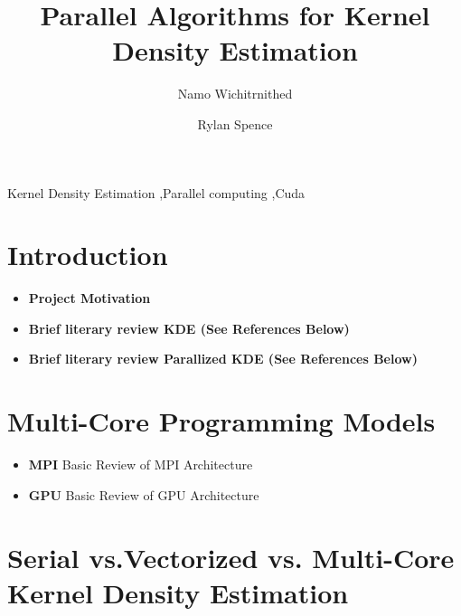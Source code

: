 \documentclass[review]{elsarticle}
\begin{document}
\begin{frontmatter}

\title{Parallel Algorithms for Kernel Density Estimation}


\author[oden]{Namo Wichitrnithed}

\author[oden]{Rylan Spence}



\begin{abstract}

\end{abstract}

\begin{keyword}
Kernel Density Estimation \sep Parallel computing \sep Cuda
\end{keyword}

\end{frontmatter}


\section{Introduction}

\begin{itemize}
    \item \textbf{Project Motivation}
    \item \textbf{Brief literary review KDE (See References Below)}
    \item \textbf{Brief literary review Parallized KDE (See References Below)}
\end{itemize}

\section{Multi-Core Programming Models}

\begin{itemize}
    \item \textbf{MPI} \newline
    Basic Review of MPI Architecture
    \item \textbf{GPU} \newline
    Basic Review of GPU Architecture
\end{itemize}

\section{Serial vs.Vectorized vs. Multi-Core Kernel Density Estimation}
\end{document}
